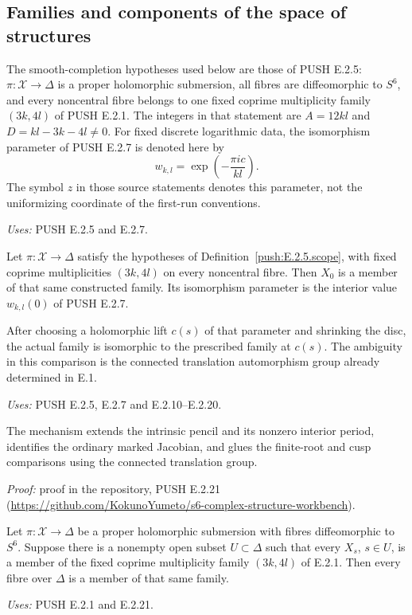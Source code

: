 \subsection{Families and components of the space of structures}
\begin{definition}\label{push:E.2.5.scope}
The smooth-completion hypotheses used below are those of PUSH E.2.5:
$\pi:\mathcal X\to\Delta$ is a proper holomorphic submersion,
all fibres are diffeomorphic to $S^6$, and every noncentral fibre belongs
to one fixed coprime multiplicity family $(3k,4l)$ of PUSH E.2.1.
The integers in that statement are $A=12kl$ and $D=kl-3k-4l\ne0$.
For fixed discrete logarithmic data, the isomorphism parameter of
PUSH E.2.7 is denoted here by
\[
 w_{k,l}=\exp\!\left(-\frac{\pi i c}{kl}\right).
\]
The symbol $z$ in those source statements denotes this parameter,
not the uniformizing coordinate of the first-run conventions.
\end{definition}
\noindent\emph{Uses:} PUSH E.2.5 and E.2.7.\par

\begin{announcement}[PUSH E.2.21; A]\label{push:E.2.21}
Let $\pi:\mathcal X\to\Delta$ satisfy the hypotheses of
Definition~\ref{push:E.2.5.scope}, with fixed coprime multiplicities $(3k,4l)$ on
every noncentral fibre.  Then $X_0$ is a member of that
same constructed family.  Its isomorphism parameter is
the interior value $w_{k,l}(0)$ of PUSH E.2.7.

After choosing a holomorphic lift $c(s)$ of that parameter
and shrinking the disc, the actual family is isomorphic
to the prescribed family at $c(s)$.  The ambiguity in
this comparison is the connected translation automorphism
group already determined in E.1.
\end{announcement}
\noindent\emph{Uses:} PUSH E.2.5, E.2.7 and E.2.10--E.2.20.\par

The mechanism extends the intrinsic pencil and its nonzero interior period, identifies the ordinary marked Jacobian, and glues the finite-root and cusp comparisons using the connected translation group.

\noindent\emph{Proof:} proof in the repository, PUSH E.2.21 (\url{https://github.com/KokunoYumeto/s6-complex-structure-workbench}).

\begin{announcement}[PUSH E.2.22; A]\label{push:E.2.22}
Let $\pi:\mathcal X\to\Delta$ be a proper holomorphic
submersion with fibres diffeomorphic to $S^6$.  Suppose
there is a nonempty open subset $U\subset\Delta$ such
that every $X_s$, $s\in U$, is a member of the fixed
coprime multiplicity family $(3k,4l)$ of E.2.1.
Then every fibre over $\Delta$ is a member of that
same family.
\end{announcement}
\noindent\emph{Uses:} PUSH E.2.1 and E.2.21.\par

